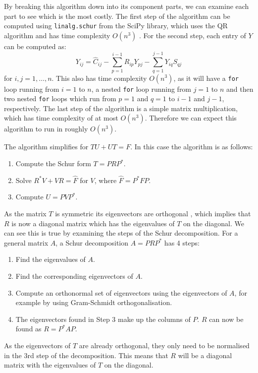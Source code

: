 \documentclass[11pt]{article}
\numberwithin{equation}{section}
\begin{document}
By breaking this algorithm down into its component parts, we can examine each part to see which is the most costly. The first step of the algorithm can be computed using \texttt{linalg.schur} from the SciPy library, which uses the QR algorithm and has time complexity $O(n^3)$ \cite{Parlett}. For the second step, each entry of $Y$ can be computed as:
\begin{equation}
Y_{ij} = \hat{C}_{ij} - \sum_{p=1}^{i-1} R_{ip}Y_{pj} - \sum_{q=1}^{j-1} Y_{iq}S_{qj}
\end{equation}
for $i,j=1, \dots, n$. This also has time complexity $O(n^3)$, as it will have a \texttt{for} loop running from $i=1$ to $n$, a nested \texttt{for} loop running from $j=1$ to $n$ and then two nested \texttt{for} loops which run from $p=1$ and $q=1$ to $i-1$ and $j-1$, respectively. The last step of the algorithm is a simple matrix multiplication, which has time complexity of at most $O(n^3)$. Therefore we can expect this algorithm to run in roughly $O(n^3)$. 

The algorithm simplifies for $TU+UT=F$. In this case the algorithm is as follows:
\begin{enumerate}
\item Compute the Schur form $T=PRP^*$.
\item Solve $R^*V + VR = \hat{F}$ for $V$, where $\hat{F} =  P^*FP$.
\item Compute $U=PVP^*$.
\end{enumerate}
As the matrix $T$ is symmetric its eigenvectors are orthogonal \cite{Quandt}, which implies that $R$ is now a diagonal matrix which has the eigenvalues of $T$ on the diagonal. We can see this is true by examining the steps of the Schur decomposition. For a general matrix $A$, a Schur decomposition $A=PRP^*$ has 4 steps:
\begin{enumerate}
\item Find the eigenvalues of $A$.
\item Find the corresponding eigenvectors of $A$.
\item Compute an orthonormal set of eigenvectors using the eigenvectors of $A$, for example by using Gram-Schmidt orthogonalisation.
\item The eigenvectors found in Step 3 make up the columns of $P$. $R$ can now be found as $R=P^*AP$. 
\end{enumerate}
As the eigenvectors of $T$ are already orthogonal, they only need to be normalised in the 3rd step of the decomposition. This means that $R$ will be a diagonal matrix with the eigenvalues of $T$ on the diagonal.
\end{document}
